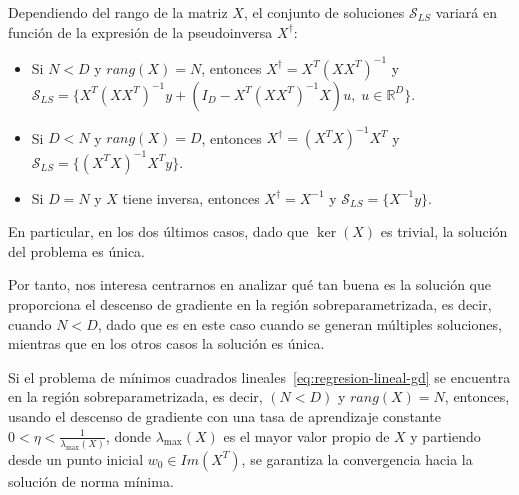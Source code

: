 \begin{observacion}
    Dependiendo del rango de la matriz $X$, el conjunto de soluciones $\mathcal{S}_{LS}$ variará en función de la expresión de la pseudoinversa $X^{\dagger}$:

    \begin{itemize}
        \item Si $N < D$ y $rang(X) = N$, entonces $X^{\dagger} = X^{T}{(XX^{T})}^{-1}$ y $\mathcal{S}_{LS} = \{ X^{T}{(XX^{T})}^{-1}y + (I_D-X^{T}{(XX^{T})}^{-1}X)u, \; u \in \mathbb{R}^{D} \}$.
        
        \item Si $D < N$ y $rang(X) = D$, entonces $X^{\dagger} = {(X^{T}X)}^{-1}X^{T}$ y $\mathcal{S}_{LS} = \{ {(X^{T}X)}^{-1}X^{T}y \}$.
        
        \item Si $D = N$ y $X$ tiene inversa, entonces $X^{\dagger} = {X}^{-1}$ y $\mathcal{S}_{LS} = \{{X}^{-1}y \}$.
    \end{itemize}

    En particular, en los dos últimos casos, dado que $\ker(X)$ es trivial, la solución del problema es única.\newline
\end{observacion}

Por tanto, nos interesa centrarnos en analizar qué tan buena es la solución que proporciona el descenso de gradiente en la región sobreparametrizada, es decir, cuando $N < D$, dado que es en este caso cuando se generan múltiples soluciones, mientras que en los otros casos la solución es única.

\begin{teorema}
    Si el problema de mínimos cuadrados lineales~\eqref{eq:regresion-lineal-gd} se encuentra en la región sobreparametrizada, es decir, $(N < D)$ y $rang(X) = N$, entonces, usando el descenso de gradiente con una tasa de aprendizaje constante $0 < \eta < \frac{1}{\lambda_{\max}(X)}$, donde $\lambda_{\max}(X)$ es el mayor valor propio de $X$ y partiendo desde un punto inicial $w_0 \in Im(X^{T})$, se garantiza la convergencia hacia la solución de norma mínima.
\end{teorema}

